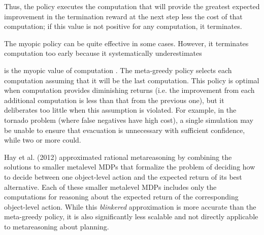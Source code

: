 Thus, the policy executes the computation that will provide the greatest expected improvement in the termination reward at the next step less the cost of that computation; if this value is not positive for any computation, it terminates.

The myopic policy can be quite effective in some cases. However, it terminates computation too early because it systematically underestimates


  
%
is the myopic value of computation \cite{Russell1991}. The meta-greedy policy selects each computation assuming that it will be the last computation. 
This policy is optimal when computation provides diminishing returns (i.e. the improvement from each additional computation is less than that from the previous one), but it deliberates too little when this assumption is violated.
For example, in the tornado problem (where false negatives have high cost), a single simulation may be unable to ensure that evacuation is unnecessary with sufficient confidence, while two or more could.

Hay et al. (2012) approximated rational metareasoning by combining the solutions to smaller metalevel MDPs that formalize the problem of deciding how to decide between one object-level action and the expected return of its best alternative.
Each of these smaller metalevel MDPs includes only the computations for reasoning about the expected return of the corresponding object-level action.
While this \textit{blinkered} approximation is more accurate than the meta-greedy policy, it is also significantly less scalable and not directly applicable to metareasoning about planning. %

